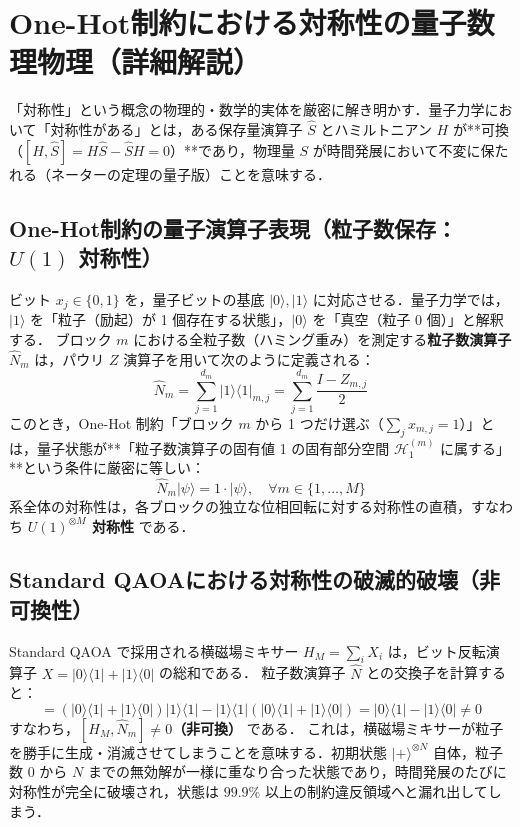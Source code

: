 \documentclass[11pt,a4paper]{ltjsarticle}
\newcommand{\ket}[1]{|#1\rangle}
\newcommand{\bra}[1]{\langle#1|}
\begin{document}
\section{One-Hot制約における対称性の量子数理物理（詳細解説）}
\label{sec:symmetry_physics}

「対称性」という概念の物理的・数学的実体を厳密に解き明かす．量子力学において「対称性がある」とは，ある保存量演算子 $\hat{S}$ とハミルトニアン $H$ が**可換（$[H, \hat{S}] = H\hat{S} - \hat{S}H = 0$）**であり，物理量 $S$ が時間発展において不変に保たれる（ネーターの定理の量子版）ことを意味する．

\subsection{\texorpdfstring{One-Hot制約の量子演算子表現（粒子数保存：$U(1)$ 対称性）}{One-Hot制約の量子演算子表現（粒子数保存：U(1) 対称性）}}
ビット $x_j \in \{0, 1\}$ を，量子ビットの基底 $\ket{0}, \ket{1}$ に対応させる．量子力学では，$\ket{1}$ を「粒子（励起）が 1 個存在する状態」，$\ket{0}$ を「真空（粒子 0 個）」と解釈する．
ブロック $m$ における全粒子数（ハミング重み）を測定する\textbf{粒子数演算子 $\hat{N}_m$} は，パウリ $Z$ 演算子を用いて次のように定義される：
\begin{equation}
\hat{N}_m = \sum_{j=1}^{d_m} \ket{1}\bra{1}_{m, j} = \sum_{j=1}^{d_m} \frac{I - Z_{m, j}}{2}
\end{equation}
このとき，One-Hot 制約「ブロック $m$ から 1 つだけ選ぶ（$\sum_j x_{m,j} = 1$）」とは，量子状態が**「粒子数演算子の固有値 1 の固有部分空間 $\mathcal{H}_1^{(m)}$ に属する」**という条件に厳密に等しい：
\begin{equation}
\hat{N}_m \ket{\psi} = 1 \cdot \ket{\psi}, \quad \forall m \in \{1, \dots, M\}
\end{equation}
系全体の対称性は，各ブロックの独立な位相回転に対する対称性の直積，すなわち \textbf{$U(1)^{\otimes M}$ 対称性} である．

\subsection{Standard QAOAにおける対称性の破滅的破壊（非可換性）}
Standard QAOA で採用される横磁場ミキサー $H_M = \sum_i X_i$ は，ビット反転演算子 $X = \ket{0}\bra{1} + \ket{1}\bra{0}$ の総和である．
粒子数演算子 $\hat{N}$ との交換子を計算すると：
\begin{equation}
[X_j, \ket{1}\bra{1}_j] = (\ket{0}\bra{1} + \ket{1}\bra{0})\ket{1}\bra{1} - \ket{1}\bra{1}(\ket{0}\bra{1} + \ket{1}\bra{0}) = \ket{0}\bra{1} - \ket{1}\bra{0} \neq 0
\end{equation}
すなわち，\textbf{$[H_M, \hat{N}_m] \neq 0$（非可換）} である．
これは，横磁場ミキサーが粒子を勝手に生成・消滅させてしまうことを意味する．初期状態 $\ket{+}^{\otimes N}$ 自体，粒子数 0 から $N$ までの無効解が一様に重なり合った状態であり，時間発展のたびに対称性が完全に破壊され，状態は $99.9\%$ 以上の制約違反領域へと漏れ出してしまう．
\end{document}
